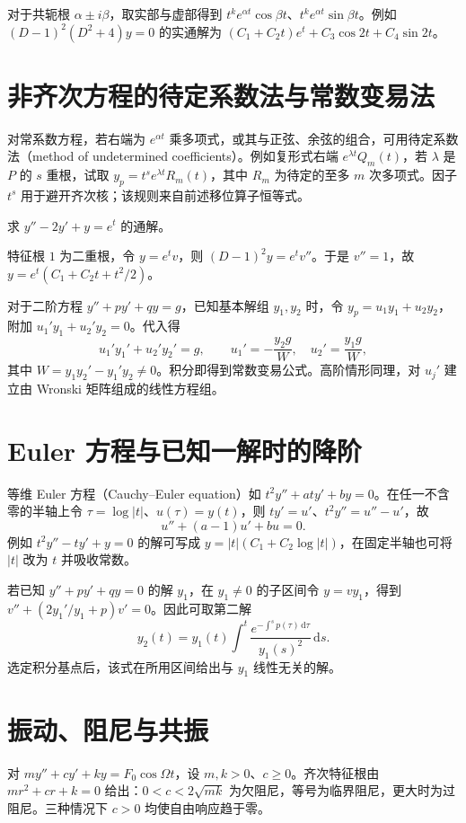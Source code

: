 \documentclass[UTF8,12pt,a4paper,fontset=fandol]{ctexbook}
\begin{document}
对于共轭根 $\alpha\pm i\beta$，取实部与虚部得到 $t^ke^{\alpha t}\cos\beta t$、$t^ke^{\alpha t}\sin\beta t$。例如 $(D-1)^2(D^2+4)y=0$ 的实通解为 $(C_1+C_2t)e^t+C_3\cos2t+C_4\sin2t$。

\section{非齐次方程的待定系数法与常数变易法}
对常系数方程，若右端为 $e^{\alpha t}$ 乘多项式，或其与正弦、余弦的组合，可用待定系数法（method of undetermined coefficients）。例如复形式右端 $e^{\lambda t}Q_m(t)$，若 $\lambda$ 是 $P$ 的 $s$ 重根，试取 $y_p=t^se^{\lambda t}R_m(t)$，其中 $R_m$ 为待定的至多 $m$ 次多项式。因子 $t^s$ 用于避开齐次核；该规则来自前述移位算子恒等式。

\begin{example}
求 $y''-2y'+y=e^t$ 的通解。
\end{example}
\begin{solve}
特征根 $1$ 为二重根，令 $y=e^tv$，则 $(D-1)^2y=e^tv''$。于是 $v''=1$，故 $y=e^t(C_1+C_2t+t^2/2)$。
\end{solve}

对于二阶方程 $y''+py'+qy=g$，已知基本解组 $y_1,y_2$ 时，令 $y_p=u_1y_1+u_2y_2$，附加 $u_1'y_1+u_2'y_2=0$。代入得
\[
 u_1'y_1'+u_2'y_2'=g,\qquad
 u_1'=-\frac{y_2g}{W},\quad u_2'=\frac{y_1g}{W},
\]
其中 $W=y_1y_2'-y_1'y_2\ne0$。积分即得到常数变易公式。高阶情形同理，对 $u_j'$ 建立由 Wronski 矩阵组成的线性方程组。

\section{Euler 方程与已知一解时的降阶}
等维 Euler 方程（Cauchy--Euler equation）如 $t^2y''+aty'+by=0$。在任一不含零的半轴上令 $\tau=\log|t|$、$u(\tau)=y(t)$，则 $ty'=u'$、$t^2y''=u''-u'$，故
\[
 u''+(a-1)u'+bu=0.
\]
例如 $t^2y''-ty'+y=0$ 的解可写成 $y=|t|(C_1+C_2\log|t|)$，在固定半轴也可将 $|t|$ 改为 $t$ 并吸收常数。

若已知 $y''+py'+qy=0$ 的解 $y_1$，在 $y_1\ne0$ 的子区间令 $y=v y_1$，得到 $v''+(2y_1'/y_1+p)v'=0$。因此可取第二解
\[
 y_2(t)=y_1(t)\int^t\frac{e^{-\int^s p(\tau)\,\mathrm d\tau}}{y_1(s)^2}\,\mathrm ds.
\]
选定积分基点后，该式在所用区间给出与 $y_1$ 线性无关的解。

\section{振动、阻尼与共振}
对 $my''+cy'+ky=F_0\cos\Omega t$，设 $m,k>0$、$c\geq0$。齐次特征根由 $mr^2+cr+k=0$ 给出：$0<c<2\sqrt{mk}$ 为欠阻尼，等号为临界阻尼，更大时为过阻尼。三种情况下 $c>0$ 均使自由响应趋于零。
\end{document}
